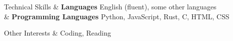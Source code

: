 \documentclass{cv}
\begin{document}
\begin{CVSection}{Technical Skills}
    & \textbf{Languages} \newline English (fluent), some other languages \\
    & \textbf{Programming Languages} \newline Python, JavaScript, Rust, C, HTML, CSS \\
\end{CVSection}

\begin{CVSection}{Other Interests}
    & Coding, Reading \\
\end{CVSection}
\end{document}
